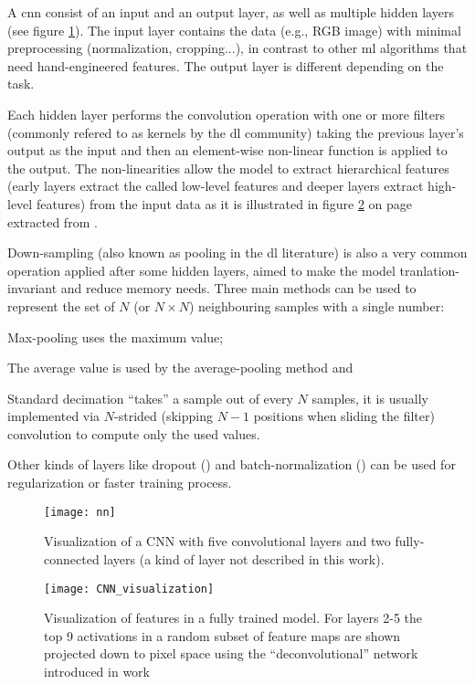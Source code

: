 \documentclass[../main.tex]{subfiles}
\begin{document}
A \gls{cnn} consist of an input and an output layer, as well as multiple hidden
layers (see figure \ref{fig:alexnet}). The input layer contains the data
(e.g., RGB image) with minimal preprocessing (normalization, cropping...),
in contrast to other \gls{ml} algorithms that need hand-engineered features.
The output layer is different depending on the task.

Each hidden layer performs the convolution operation with one or more
filters (commonly refered to as kernels by the \gls{dl} community) taking the
previous layer's output as the input and then an element-wise
non-linear function is applied to the output.
The non-linearities allow the model to extract
hierarchical features (early layers extract the called low-level features
and deeper layers extract high-level features)
from the input data as it is illustrated in figure
\ref{fig:cnn-visualization} on page~\pageref{fig:cnn-visualization}
extracted from \cite{Zeiler2014}.

Down-sampling (also known as pooling in the \gls{dl} literature) is also a very
common operation applied after some hidden layers, aimed to make the model
tranlation-invariant and reduce memory needs.
Three main methods can be used to represent the set of
$N$ (or $N \times N$) neighbouring samples with a single number:
\begin{enumerate*}[label=\itshape\alph*\upshape)]
\item Max-pooling uses the maximum value;
\item The average value is used by the average-pooling method and
\item Standard decimation ``takes'' a sample out of every $N$ samples,
it is usually implemented via $N$-strided (skipping $N - 1$ positions when
sliding the filter) convolution to compute only the used values.
\label{n-strided-conv}
\end{enumerate*}

Other kinds of layers like dropout (\cite{Srivastava2014})
and batch-normalization (\cite{Ioffe2015}) can be used for regularization
or faster training process.

\begin{figure}[h]
\centering
\texttt{[image: nn]}
\caption{Visualization of a CNN with five convolutional layers and two
fully-connected layers (a kind of layer not described in this work).}
\label{fig:alexnet}
\end{figure}

\begin{figure}[h]
\centering
\texttt{[image: CNN\_visualization]}
\caption{Visualization of features in a fully trained model.
For layers 2-5 the top 9 activations in a random subset of feature maps are shown
projected down to pixel space using the ``deconvolutional'' network introduced in
\cite{Zeiler2014} work}
\label{fig:cnn-visualization}
\end{figure}
\end{document}
